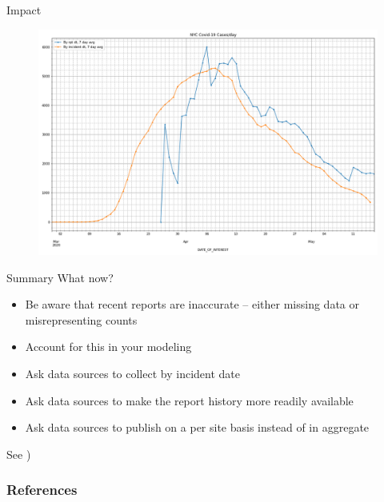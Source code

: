 \documentclass[aspectratio=169]{beamer}
\begin{document}
\begin{frame}{Impact}
  \begin{figure}
    \centering
    \includegraphics[height=.8\textheight]{../Notebooks/casesPerDayHistoryRptDtVsInDt.png}
  \end{figure}
\end{frame}

\begin{frame}{Summary}
  What now?
  \begin{itemize}
  \item Be aware that recent reports are inaccurate -- either missing
    data or misrepresenting counts
  \item Account for this in your modeling
  \item Ask data sources to collect by incident date
  \item Ask data sources to make the report history more readily available
  \item Ask data sources to publish on a per site basis instead of in aggregate
  \end{itemize}

  See ) 
\end{frame}

\begin{frame}[allowframebreaks]
  \frametitle{References}
  \label{refs}
  \begin{small}
  \printbibliography
  \end{small}
\vfil
\vbox{\hbox{}
}%
\end{frame}
\end{document}
